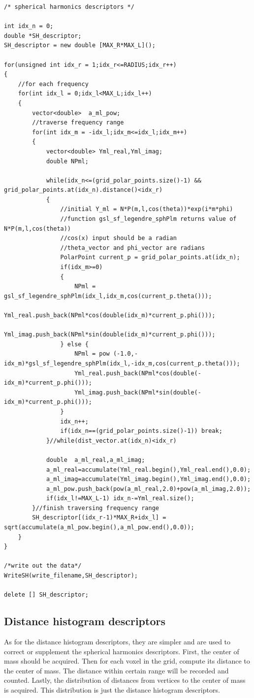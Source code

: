 \begin{lstlisting}[xleftmargin=0em]
/* spherical harmonics descriptors */

int idx_n = 0;
double *SH_descriptor;
SH_descriptor = new double [MAX_R*MAX_L]();

for(unsigned int idx_r = 1;idx_r<=RADIUS;idx_r++)
{
	//for each frequency
	for(int idx_l = 0;idx_l<MAX_L;idx_l++)
	{
		vector<double> 	a_ml_pow;
		//traverse frequency range
		for(int idx_m = -idx_l;idx_m<=idx_l;idx_m++)
		{
			vector<double> Yml_real,Yml_imag;
			double NPml;

			while(idx_n<=(grid_polar_points.size()-1) && grid_polar_points.at(idx_n).distance()<idx_r)
			{
				//initial Y_ml = N*P(m,l,cos(theta))*exp(i*m*phi)
				//function gsl_sf_legendre_sphPlm returns value of N*P(m,l,cos(theta))
				//cos(x) input should be a radian
				//theta_vector and phi_vector are radians
				PolarPoint current_p = grid_polar_points.at(idx_n);
				if(idx_m>=0)
				{
					NPml = gsl_sf_legendre_sphPlm(idx_l,idx_m,cos(current_p.theta()));
					Yml_real.push_back(NPml*cos(double(idx_m)*current_p.phi()));
					Yml_imag.push_back(NPml*sin(double(idx_m)*current_p.phi()));
				} else {
					NPml = pow (-1.0,-idx_m)*gsl_sf_legendre_sphPlm(idx_l,-idx_m,cos(current_p.theta()));
					Yml_real.push_back(NPml*cos(double(-idx_m)*current_p.phi()));
					Yml_imag.push_back(NPml*sin(double(-idx_m)*current_p.phi()));
				}
				idx_n++;
				if(idx_n==(grid_polar_points.size()-1)) break;
			}//while(dist_vector.at(idx_n)<idx_r)

			double 	a_ml_real,a_ml_imag;
			a_ml_real=accumulate(Yml_real.begin(),Yml_real.end(),0.0);
			a_ml_imag=accumulate(Yml_imag.begin(),Yml_imag.end(),0.0);
			a_ml_pow.push_back(pow(a_ml_real,2.0)+pow(a_ml_imag,2.0));
			if(idx_l!=MAX_L-1) idx_n-=Yml_real.size();
		}//finish traversing frequency range
		SH_descriptor[(idx_r-1)*MAX_R+idx_l] = sqrt(accumulate(a_ml_pow.begin(),a_ml_pow.end(),0.0));
	}
}

/*write out the data*/
WriteSH(write_filename,SH_descriptor);

delete [] SH_descriptor;
\end{lstlisting}


\subsection{Distance histogram descriptors}

As for the distance histogram descriptors, they are simpler and are used to correct or supplement the spherical harmonics descriptors. First, the center of mass should be acquired. Then for each voxel in the grid, compute its distance to the center of mass. The distance within certain range will be recorded and counted. Lastly, the 
distribution of distances from vertices to the center of mass is acquired. This distribution is just the distance histogram descriptors.  

